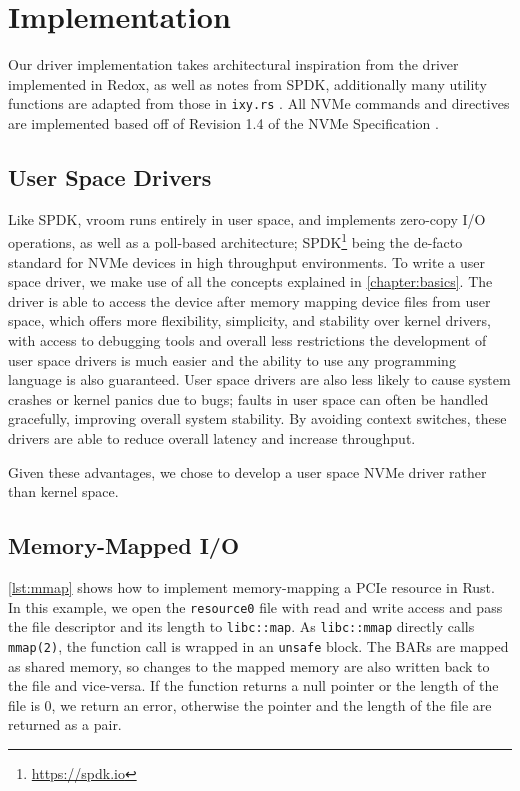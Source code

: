 \chapter{Implementation}\label{chapter:implementation}
Our driver implementation takes architectural inspiration from the driver implemented in Redox, as well as notes from SPDK, additionally many utility functions are adapted from those in \texttt{ixy.rs} \cite{ixy.rs}. All NVMe commands and directives are implemented based off of Revision 1.4 of the NVMe Specification \cite{nvme-spec}.

\section{User Space Drivers}
Like SPDK, vroom runs entirely in user space, and implements zero-copy I/O operations, as well as a poll-based architecture; SPDK\footnote{\url{https://spdk.io}} being the de-facto standard for NVMe devices in high throughput environments. To write a user space driver, we make use of all the concepts explained in \autoref{chapter:basics}. The driver is able to access the device after memory mapping device files from user space, which offers more flexibility, simplicity, and stability over kernel drivers, with access to debugging tools and overall less restrictions the development of user space drivers is much easier and the ability to use any programming language is also guaranteed. User space drivers are also less likely to cause system crashes or kernel panics due to bugs; faults in user space can often be handled gracefully, improving overall system stability. By avoiding context switches, these drivers are able to reduce overall latency and increase throughput.

Given these advantages, we chose to develop a user space NVMe driver rather than kernel space.

\section{Memory-Mapped I/O}\label{section:MMIO}

\autoref{lst:mmap} shows how to implement memory-mapping a PCIe resource in Rust. In this example, we open the \texttt{resource0} file with read and write access and pass the file descriptor and its length to \texttt{libc::map}. As \texttt{libc::mmap} directly calls \texttt{mmap(2)}, the function call is wrapped in an \texttt{unsafe} block. The BARs are mapped as shared memory, so changes to the mapped memory are also written back to the file and vice-versa. If the function returns a null pointer or the length of the file is 0, we return an error, otherwise the pointer and the length of the file are returned as a pair.

